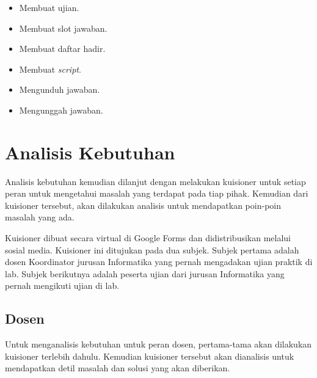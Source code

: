         \begin{itemize}
            \item Membuat ujian.
            \item Membuat slot jawaban.
            \item Membuat daftar hadir.
            \item Membuat \textit{script}.
            \item Mengunduh jawaban.
            \item Mengunggah jawaban.
        \end{itemize}


    
\section{Analisis Kebutuhan}

    Analisis kebutuhan kemudian dilanjut dengan melakukan kuisioner untuk setiap
    peran untuk mengetahui masalah yang terdapat pada tiap pihak. Kemudian dari
    kuisioner tersebut, akan dilakukan analisis untuk mendapatkan poin-poin
    masalah yang ada.

    Kuisioner dibuat secara virtual di Google Forms dan didistribusikan melalui
    sosial media. Kuisioner ini ditujukan pada dua subjek. Subjek pertama adalah
    dosen Koordinator jurusan Informatika yang pernah mengadakan ujian praktik
    di lab. Subjek berikutnya adalah peserta ujian dari jurusan Informatika yang
    pernah mengikuti ujian di lab. 
    
\subsection{Dosen}
    Untuk menganalisis kebutuhan untuk peran dosen, pertama-tama akan dilakukan
    kuisioner terlebih dahulu. Kemudian kuisioner tersebut akan dianalisis untuk
    mendapatkan detil masalah dan solusi yang akan diberikan.

